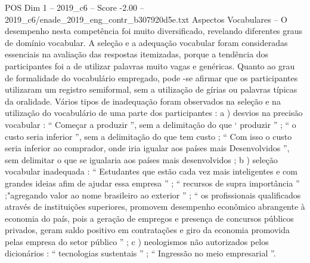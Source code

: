 \begin{textsample}{POS Dim 1 – 2019\_c6 – Score -2.00 – 2019\_c6/enade\_2019\_eng\_contr\_b307920d5e.txt}
Aspectos Vocabulares – O desempenho nesta competência foi muito diversificado, revelando diferentes graus de domínio vocabular.
A seleção e a adequação vocabular foram consideradas essenciais na avaliação das respostas itemizadas, porque a tendência dos participantes foi a de utilizar palavras muito vagas e genéricas.
Quanto ao grau de formalidade do vocabulário empregado, pode -se afirmar que os participantes utilizaram um registro semiformal, sem a utilização de gírias ou palavras típicas da oralidade.
Vários tipos de inadequação foram observados na seleção e na utilização do vocabulário de uma parte dos participantes : a ) desvios na precisão vocabular : “ Começar a produzir ”, sem a delimitação do que ‘ produzir ” ; “ o custo seria inferior ”, sem a delimitação do que tem custo ; “ Com isso o custo seria inferior ao comprador, onde iria igualar aos países mais Desenvolvidos ”, sem delimitar o que se igualaria aos países mais desenvolvidos ; b ) seleção vocabular inadequada : “ Estudantes que estão cada vez mais inteligentes e com grandes ideias afim de ajudar essa empresa ” ; “ recursos de supra importância ” ;"agregando valor ao nome brasileiro ao exterior ” ; “ os profissionais qualificados através de instituições superiores, promovem desempenho econômico abrangente à economia do país, pois a geração de empregos e presença de concursos públicos privados, geram saldo positivo em contratações e giro da economia promovida pelas empresa do setor público ” ; c ) neologismos não autorizados pelos dicionários : “ tecnologias sustentais ” ; “ Ingressão no meio empresarial ”.

\end{textsample}
